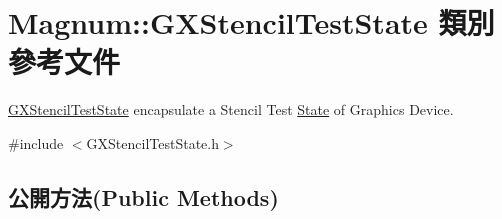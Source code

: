 \hypertarget{class_magnum_1_1_g_x_stencil_test_state}{}\section{Magnum\+:\+:G\+X\+Stencil\+Test\+State 類別 參考文件}
\label{class_magnum_1_1_g_x_stencil_test_state}


\hyperlink{class_magnum_1_1_g_x_stencil_test_state}{G\+X\+Stencil\+Test\+State} encapsulate a Stencil Test \hyperlink{class_magnum_1_1_state}{State} of Graphics Device.  




{\ttfamily \#include $<$G\+X\+Stencil\+Test\+State.\+h$>$}

\subsection*{公開方法(Public Methods)}
